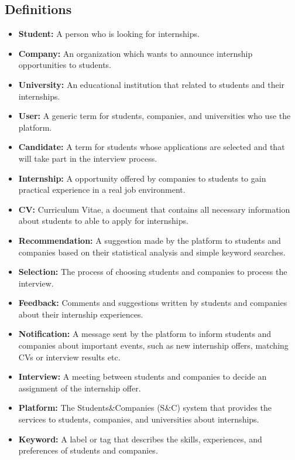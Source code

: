 \subsection{Definitions}\label{subsec:definitions}
\begin{itemize}
    \item \textbf{Student:} A person who is looking for internships.
    \item \textbf{Company:} An organization which wants to announce internship opportunities to students.
    \item \textbf{University:} An educational institution that related to students and their internships.
    \item \textbf{User:} A generic term for students, companies, and universities who use the platform.
    \item \textbf{Candidate:} A term for students whose applications are selected and that will take part in the interview process.
    \item \textbf{Internship:} A opportunity offered by companies to students to gain practical experience in a real job environment.
    \item \textbf{CV:} Curriculum Vitae, a document that contains all necessary information about students to able to apply for internships.
    \item \textbf{Recommendation:} A suggestion made by the platform to students and companies based on their statistical analysis and simple 
    keyword searches.
    \item \textbf{Selection:} The process of choosing students and companies to process the interview.
    \item \textbf{Feedback:} Comments and suggestions written by students and companies about their internship experiences.
    \item \textbf{Notification:} A message sent by the platform to inform students and companies about important events, such as new internship 
    offers, matching CVs or interview results etc.
    \item \textbf{Interview:} A meeting between students and companies to decide an assignment of the internship offer.
    \item \textbf{Platform:} The Students\&Companies (S\&C) system that provides the services to students, companies, and universities about
    internships.
    \item \textbf{Keyword:} A label or tag that describes the skills, experiences, and preferences of students and companies.

\end{itemize}

